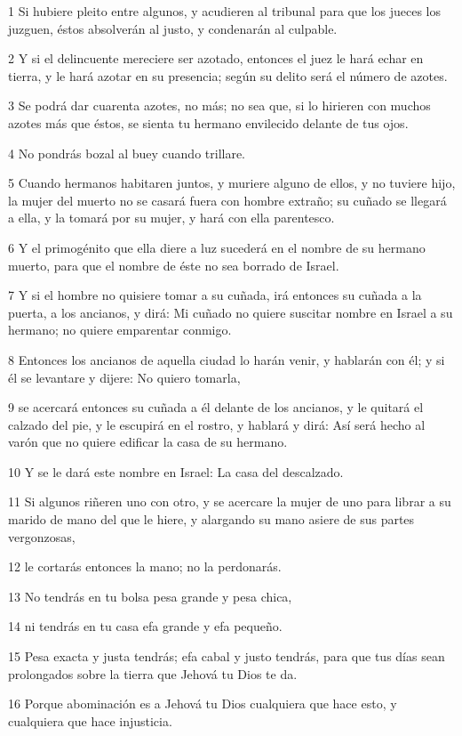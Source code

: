 \par 1 Si hubiere pleito entre algunos, y acudieren al tribunal para que los jueces los juzguen, éstos absolverán al justo, y condenarán al culpable.
\par 2 Y si el delincuente mereciere ser azotado, entonces el juez le hará echar en tierra, y le hará azotar en su presencia; según su delito será el número de azotes.
\par 3 Se podrá dar cuarenta azotes, no más; no sea que, si lo hirieren con muchos azotes más que éstos, se sienta tu hermano envilecido delante de tus ojos.
\par 4 No pondrás bozal al buey cuando trillare.
\par 5 Cuando hermanos habitaren juntos, y muriere alguno de ellos, y no tuviere hijo, la mujer del muerto no se casará fuera con hombre extraño; su cuñado se llegará a ella, y la tomará por su mujer, y hará con ella parentesco.
\par 6 Y el primogénito que ella diere a luz sucederá en el nombre de su hermano muerto, para que el nombre de éste no sea borrado de Israel. 
\par 7 Y si el hombre no quisiere tomar a su cuñada, irá entonces su cuñada a la puerta, a los ancianos, y dirá: Mi cuñado no quiere suscitar nombre en Israel a su hermano; no quiere emparentar conmigo.
\par 8 Entonces los ancianos de aquella ciudad lo harán venir, y hablarán con él; y si él se levantare y dijere: No quiero tomarla,
\par 9 se acercará entonces su cuñada a él delante de los ancianos, y le quitará el calzado del pie, y le escupirá en el rostro, y hablará y dirá: Así será hecho al varón que no quiere edificar la casa de su hermano.
\par 10 Y se le dará este nombre en Israel: La casa del descalzado. 
\par 11 Si algunos riñeren uno con otro, y se acercare la mujer de uno para librar a su marido de mano del que le hiere, y alargando su mano asiere de sus partes vergonzosas,
\par 12 le cortarás entonces la mano; no la perdonarás.
\par 13 No tendrás en tu bolsa pesa grande y pesa chica,
\par 14 ni tendrás en tu casa efa   grande y efa pequeño.
\par 15 Pesa exacta y justa tendrás; efa   cabal y justo tendrás, para que tus días sean prolongados sobre la tierra que Jehová tu Dios te da.
\par 16 Porque abominación es a Jehová tu Dios cualquiera que hace esto, y cualquiera que hace injusticia. 

